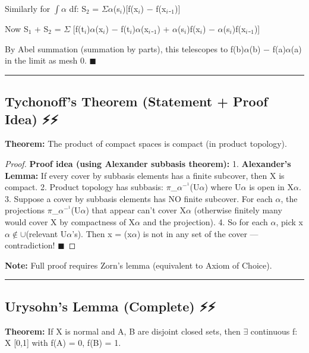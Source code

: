 \documentclass[12pt,a4paper,openany]{book}
\begin{document}
{{Similarly for $\int\alpha$ df:
S$_2$ = $\Sigma\alpha$(s$_i$)[f(x$_i$) − f(x$_i$₋$_1$)]

Now S$_1$ + S$_2$ = $\Sigma$ [f(t$_i$)$\alpha$(x$_i$) − f(t$_i$)$\alpha$(x$_i$₋$_1$) + $\alpha$(s$_i$)f(x$_i$) − $\alpha$(s$_i$)f(x$_i$₋$_1$)]

By Abel summation (summation by parts), this telescopes to f(b)$\alpha$(b) − f(a)$\alpha$(a) in the limit as mesh  0. $\blacksquare$

\bigskip\noindent\rule{\textwidth}{0.4pt}\bigskip


\subsection{Tychonoff's Theorem (Statement + Proof Idea) ⚡⚡}

\begin{tcolorbox}[colback=lightblue,colframe=thmblue,title=\textbf{Theorem},breakable,boxrule=1.5pt]
\textbf{Theorem:} The product of compact spaces is compact (in product topology).
\end{tcolorbox}

\begin{proof}
\textbf{Proof idea (using Alexander subbasis theorem):}
1. \textbf{Alexander's Lemma:} If every cover by subbasis elements has a finite subcover, then X is compact.
2. Product topology has subbasis: $\pi$_$\alpha^{-}^1$(U$\alpha$) where U$\alpha$ is open in X$\alpha$.
3. Suppose a cover by subbasis elements has NO finite subcover. For each $\alpha$, the projections $\pi$_$\alpha^{-}^1$(U$\alpha$) that appear can't cover X$\alpha$ (otherwise finitely many would cover X by compactness of X$\alpha$ and the projection).
4. So for each $\alpha$, pick x$\alpha\notin\cup$(relevant U$\alpha$'s). Then x = (x$\alpha$) is not in any set of the cover — contradiction! $\blacksquare$
\end{proof}

\textbf{Note:} Full proof requires Zorn's lemma (equivalent to Axiom of Choice).

\bigskip\noindent\rule{\textwidth}{0.4pt}\bigskip

\subsection{Urysohn's Lemma (Complete) ⚡⚡}

\begin{tcolorbox}[colback=lightblue,colframe=thmblue,title=\textbf{Theorem},breakable,boxrule=1.5pt]
\textbf{Theorem:} If X is normal and A, B are disjoint closed sets, then $\exists$ continuous f: X  [0,1] with f(A) = {0}, f(B) = {1}.
\end{tcolorbox}

}}
\end{document}
